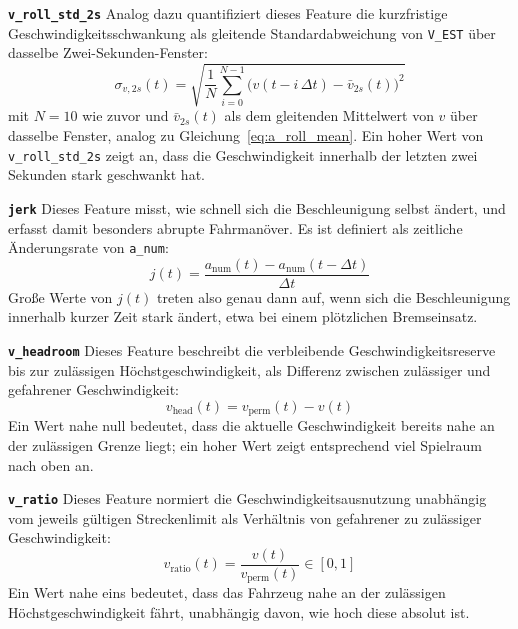 \medskip
\noindent\textbf{\texttt{v\_roll\_std\_2s}} Analog dazu quantifiziert dieses Feature die kurzfristige Geschwindigkeitsschwankung als gleitende Standardabweichung von \texttt{V\_EST} über dasselbe Zwei-Sekunden-Fenster:
\begin{equation}
    \sigma_{v,2s}(t) = \sqrt{\frac{1}{N}\sum_{i=0}^{N-1}\bigl(v(t-i\,\Delta t) - \bar{v}_{2s}(t)\bigr)^2}
    \label{eq:v_roll_std}
\end{equation}
mit $N=10$ wie zuvor und $\bar{v}_{2s}(t)$ als dem gleitenden Mittelwert von $v$ über dasselbe Fenster, analog zu Gleichung~\eqref{eq:a_roll_mean}. Ein hoher Wert von \texttt{v\_roll\_std\_2s} zeigt an, dass die Geschwindigkeit innerhalb der letzten zwei Sekunden stark geschwankt hat.

\medskip
\noindent\textbf{\texttt{jerk}} Dieses Feature misst, wie schnell sich die Beschleunigung selbst ändert, und erfasst damit besonders abrupte Fahrmanöver. Es ist definiert als zeitliche Änderungsrate von \texttt{a\_num}:
\begin{equation}
    j(t) = \frac{a_{\text{num}}(t) - a_{\text{num}}(t-\Delta t)}{\Delta t}
    \label{eq:jerk}
\end{equation}
Große Werte von $j(t)$ treten also genau dann auf, wenn sich die Beschleunigung innerhalb kurzer Zeit stark ändert, etwa bei einem plötzlichen Bremseinsatz.

\medskip
\noindent\textbf{\texttt{v\_headroom}} Dieses Feature beschreibt die verbleibende Geschwindigkeitsreserve bis zur zulässigen Höchstgeschwindigkeit, als Differenz zwischen zulässiger und gefahrener Geschwindigkeit:
\begin{equation}
    v_{\text{head}}(t) = v_{\text{perm}}(t) - v(t)
    \label{eq:v_headroom}
\end{equation}
Ein Wert nahe null bedeutet, dass die aktuelle Geschwindigkeit bereits nahe an der zulässigen Grenze liegt; ein hoher Wert zeigt entsprechend viel Spielraum nach oben an.

\medskip
\noindent\textbf{\texttt{v\_ratio}} Dieses Feature normiert die Geschwindigkeitsausnutzung unabhängig vom jeweils gültigen Streckenlimit als Verhältnis von gefahrener zu zulässiger Geschwindigkeit:
\begin{equation}
    v_{\text{ratio}}(t) = \frac{v(t)}{v_{\text{perm}}(t)} \in [0,1]
    \label{eq:v_ratio}
\end{equation}
Ein Wert nahe eins bedeutet, dass das Fahrzeug nahe an der zulässigen Höchstgeschwindigkeit fährt, unabhängig davon, wie hoch diese absolut ist.

